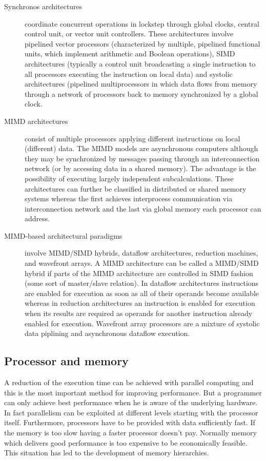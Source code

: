 \begin{description}
\item[Synchronos architectures] coordinate concurrent operations in
  lockstep through global clocks, central control unit, or vector unit
  controllers. These architectures involve pipelined vector processors
  (characterized by multiple, pipelined functional units, which
  implement arithmetic and Boolean operations), SIMD architectures
  (typically a control unit broadcasting a single instruction to
  all processors executing the instruction on local data) and systolic
  architectures (pipelined multiprocessors in which data flows from
  memory through a network of processors back to memory synchronized
  by a global clock. 
\item[MIMD architectures] consist of multiple processors applying
  different instructions on local (different) data. The MIMD models
  are asynchronous computers although they may be synchronized by
  messages passing through an interconnection network (or by accessing
  data in a shared memory). The advantage is the possibility of
  executing largely independent subcalculations. These architectures
  can further be classified in distributed or shared memory systems
  whereas the first achieves interprocess communication via 
  interconnection network and the last via global memory each
  processor can address.
\item[MIMD-based architectural paradigms] involve MIMD/SIMD hybrids,
  dataflow architectures, reduction machines, and wavefront arrays. A
  MIMD architecture can be called a MIMD/SIMD hybrid if parts of the
  MIMD architecture are controlled in SIMD fashion (some sort of
  master/slave relation). In dataflow architectures instructions are
  enabled for execution as soon as all of their operands become
  available whereas in reduction architectures an instruction is
  enabled for execution when its results are required as operands for
  another instruction already enabled for execution. Wavefront array
  processors are a mixture of systolic data piplining and asynchronous
  dataflow execution.
\end{description}

\subsection{Processor and memory}

A reduction of the execution time can be achieved with parallel
computing and this is the most important method for improving
performance. But a programmer can only achieve best performance when
he is aware of the underlying hardware. In fact parallelism can be
exploited at different levels starting with the processor
itself. Furthermore, processors have to be provided with data
sufficiently fast. If the memory is too slow having a faster processor
doesn't pay. Normally memory which delivers good performance is too
expensive to be economically feasible. This situation has led to the
development of memory hierarchies.

